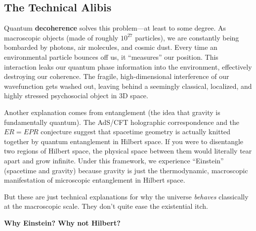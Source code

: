 \subsection*{The Technical Alibis}

Quantum \textbf{decoherence} solves this problem---at least to some degree.
As macroscopic objects (made of roughly $10^{27}$ particles), we are constantly being bombarded by photons, air molecules, and cosmic dust.
Every time an environmental particle bounces off us, it ``measures'' our position.
This interaction leaks our quantum phase information into the environment, effectively destroying our coherence.
The fragile, high-dimensional interference of our wavefunction gets washed out, leaving behind a seemingly classical, localized, and highly stressed psychosocial object in 3D space.

Another explanation comes from entanglement (the idea that gravity is fundamentally quantum).
The AdS/CFT holographic correspondence and the $ER=EPR$ conjecture suggest that spacetime geometry is actually knitted together by quantum entanglement in Hilbert space.
If you were to disentangle two regions of Hilbert space, the physical space between them would literally tear apart and grow infinite.
Under this framework, we experience ``Einstein'' (spacetime and gravity) because gravity is just the thermodynamic, macroscopic manifestation of microscopic entanglement in Hilbert space.

But these are just technical explanations for why the universe \textit{behaves} classically at the macroscopic scale. They don't quite ease the existential itch. 

\textbf{Why Einstein? Why not Hilbert?}
